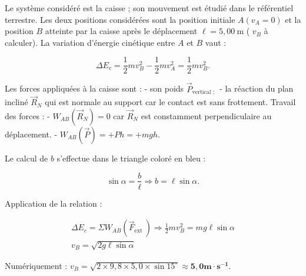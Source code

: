 Le système considéré est la caisse ; son mouvement est étudié dans le référentiel terrestre.
Les deux positions considérées sont la position initiale $A\left(v_A=0\right)$ et la position $B$ atteinte par la caisse après le déplacement $\ell=5,00 \mathrm{~m}$ ( $v_B$ à calculer).
La variation d'énergie cinétique entre $A$ et $B$ vaut :

$$
\Delta E_c=\frac{1}{2} m v_B^2-\frac{1}{2} m v_A^2=\frac{1}{2} m v_B^2 .
$$


Les forces appliquées à la caisse sont :
- son poids $\vec{P}_{\text {vertical ; }}$
- la réaction du plan incliné $\vec{R}_N$ qui est normale au support car le contact est sans frottement.
Travail des forces :
- $W_{A B}\left(\vec{R}_N\right)=0$ car $\vec{R}_N$ est constamment perpendiculaire au déplacement.
- $W_{A B}(\vec{P})=+P h=+m g h$.

Le calcul de $b$ s'effectue dans le triangle coloré en bleu :

$$
\sin \alpha=\frac{b}{\ell} \Rightarrow b=\ell \sin \alpha .
$$


Application de la relation :

$$
\begin{gathered}
\Delta E_c=\Sigma W_{A B}\left(\vec{F}_{\text {ext }}\right) \Rightarrow \frac{1}{2} m v_B^2=m g \ell \sin \alpha \\
v_B=\sqrt{2 g \ell \sin \alpha}
\end{gathered}
$$


Numériquement : $v_B=\sqrt{2 \times 9,8 \times 5,0 \times \sin 15^{\circ}} \approx \mathbf{5 , 0} \mathbf{m} \cdot \mathbf{s}^{\mathbf{- 1}}$.

